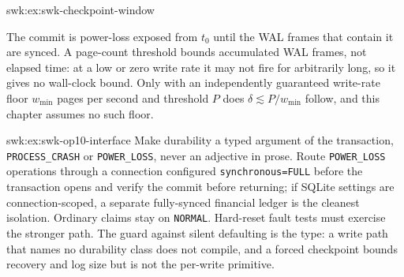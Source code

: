 \begin{pdSolution}{swk:ex:swk-checkpoint-window}
\par\smallskip
\begin{center}
%
\end{center}
\par\smallskip
The commit is power-loss exposed from $t_0$ until the WAL frames that contain it are synced. A page-count threshold bounds accumulated WAL frames, not elapsed time: at a low or zero write rate it may not fire for arbitrarily long, so it gives no wall-clock bound. Only with an independently guaranteed write-rate floor $w_{\min}$ pages per second and threshold $P$ does $\delta \lesssim P/w_{\min}$ follow, and this chapter assumes no such floor.
\end{pdSolution}
\begin{pdSolution}{swk:ex:swk-op10-interface}
Make durability a typed argument of the transaction, \texttt{PROCESS\_CRASH} or \texttt{POWER\_LOSS}, never an adjective in prose. Route \texttt{POWER\_LOSS} operations through a connection configured \texttt{synchronous=FULL} before the transaction opens and verify the commit before returning; if SQLite settings are connection-scoped, a separate fully-synced financial ledger is the cleanest isolation. Ordinary claims stay on \texttt{NORMAL}. Hard-reset fault tests must exercise the stronger path. The guard against silent defaulting is the type: a write path that names no durability class does not compile, and a forced checkpoint bounds recovery and log size but is not the per-write primitive.
\end{pdSolution}
